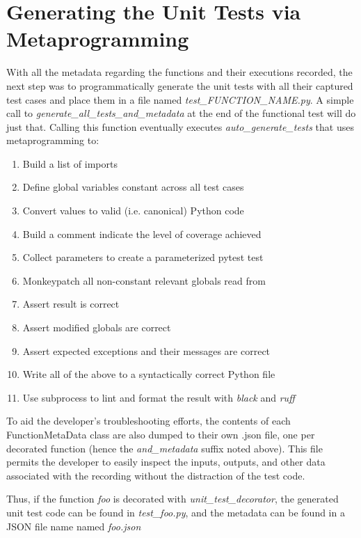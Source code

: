 \section{Generating the Unit Tests via Metaprogramming}\label{sec:generating-tests}

With all the metadata regarding the functions and their executions recorded, 
the next step was to programmatically generate the unit tests with all their 
captured test cases and place them in a file named 
\textit{test\_FUNCTION\_NAME.py}. 
A simple call to \textit{generate\_all\_tests\_and\_metadata} at the end of 
the functional test will do just that.
 Calling this function eventually executes 
\textit{auto\_generate\_tests} that uses metaprogramming to:
\begin{enumerate}[leftmargin=*]
  \item Build a list of imports
  \item Define global variables constant across all test cases
  \item Convert values to valid (i.e. canonical) Python code
  \item Build a comment indicate the level of coverage achieved
  \item Collect parameters to create a parameterized pytest test
  \item Monkeypatch all non-constant relevant globals read from
  \item Assert result is correct
  \item Assert modified globals are correct
  \item Assert expected exceptions and their messages are correct
  \item Write all of the above to a syntactically correct Python file
  \item Use subprocess to lint and format the result with \textit{black} and \textit{ruff}
\end{enumerate}

To aid the developer's troubleshooting efforts, the contents of each FunctionMetaData
class are also dumped to their own .json file, one per decorated function (hence
the \textit{and\_metadata} suffix noted above).  This file permits the 
developer to easily inspect the inputs, outputs, and other data
associated with the recording without the distraction of the test code.

Thus, if the function \textit{foo} is decorated with \textit{unit\_test\_decorator},
the generated unit test code can be found in \textit{test\_foo.py}, and the 
metadata can be found in a JSON file name named \textit{foo.json}


